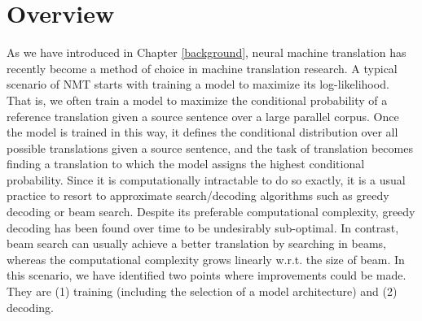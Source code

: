 \section{Overview}
\label{cp7.sec.introduction}

As we have introduced in Chapter \ref{background}, neural machine translation has recently become a method of choice in machine translation research.  
A typical scenario of  NMT starts with training a model to maximize its log-likelihood. That is, we often train a model to maximize the conditional probability of a reference translation given a source sentence over a large parallel corpus. 
Once the model is trained in this way, it defines the conditional distribution over all possible translations given a source sentence, and the task of translation becomes  finding a translation to which the model assigns the highest conditional probability. 
Since it is computationally intractable to do so exactly, it is a usual practice to resort to approximate search/decoding algorithms such as greedy decoding or beam search. 
Despite its preferable computational complexity, greedy decoding has been found over time to be undesirably sub-optimal. In contrast, beam search can usually achieve a better translation by searching in beams, whereas  the computational complexity grows linearly w.r.t. the size of beam. 
In this scenario, we have identified two points where improvements could be made. They are (1) training (including the selection of a model architecture) and (2) decoding.



